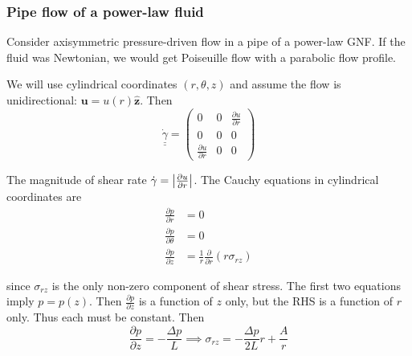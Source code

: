 \documentclass{jknotes}
\newcommand{\dunder}[1]{\underline{\underline{#1}}}
\newcommand{\srate}{\dot{\gamma}}
\begin{document}
\subsubsection{Pipe flow of a power-law fluid}
\label{sec:pipe}
Consider axisymmetric pressure-driven flow in a pipe of a power-law GNF. If
the fluid was Newtonian, we would get Poiseuille flow with a parabolic flow
profile.

\begin{center}
\end{center}

We will use cylindrical coordinates $(r,\theta,z)$ and assume the flow is
unidirectional: $\bm{u} = u(r)\hat{\bm{z}}$. Then
\begin{equation}
	\dunder{\srate} = \begin{pmatrix} 0 & 0 & \frac{\partial u}{\partial r} \\
	0 & 0 & 0 \\ \frac{\partial u}{\partial r} & 0 & 0 \end{pmatrix}
\end{equation}

The magnitude of shear rate $\srate = \abs{\frac{\partial u}{\partial r}}$.
The Cauchy equations in cylindrical coordinates are
\begin{equation}
	\begin{aligned}
		\frac{\partial p}{\partial r} &= 0 \\
		\frac{\partial p}{\partial \theta} &= 0 \\
		\frac{\partial p}{\partial z} &= \frac{1}{r} \frac{\partial}{\partial
		r} \left( r \sigma_{rz}\right)
	\end{aligned}
\end{equation}

since $\sigma_{rz}$ is the only non-zero component of shear stress. The first
two equations imply $p = p(z)$. Then $\frac{\partial p}{\partial z}$ is a
function of $z$ only, but the RHS is a function of $r$ only. Thus each
must be constant. Then
\begin{equation}
	\frac{\partial p}{\partial z} = -\frac{\Delta p}{L} \implies \sigma_{rz} =
	-\frac{\Delta p}{2L} r + \frac{A}{r}
\end{equation}
\end{document}
